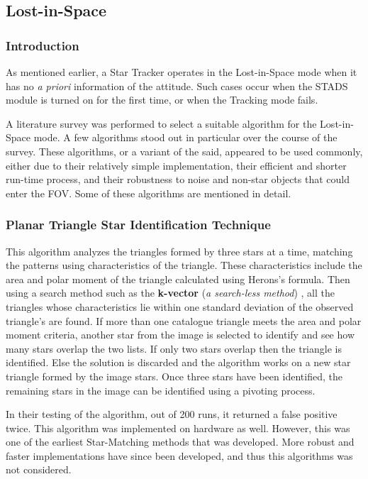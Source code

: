\subsection{Lost-in-Space}
\subsubsection{Introduction}

As mentioned earlier, a Star Tracker operates in the Lost-in-Space mode when it has no \textit{a priori} information of the attitude. Such cases occur when the STADS module is turned on for the first time, or when the Tracking mode fails.

A literature survey was performed to select a suitable algorithm for the Lost-in-Space mode. A few algorithms stood out in particular over the course of the survey. These algorithms, or a variant of the said, appeared to be used commonly, either due to their relatively simple implementation, their efficient and shorter run-time process, and their robustness to noise and non-star objects that could enter the FOV.
Some of these algorithms are mentioned in detail.

\subsubsection{Planar Triangle Star Identification Technique}

This algorithm \cite{mcbryde2012star} analyzes the triangles formed by three stars at a time, matching the patterns using characteristics of the triangle. These characteristics include the area and polar moment of the triangle calculated using Herons’s formula. 
Then using a search method such as the \textbf{k-vector} (\textit{a search-less method}) \cite{mortari2014k}, all the triangles whose characteristics lie within one standard deviation of the observed triangle's are found. 
If more than one catalogue triangle meets the area and polar moment criteria, another star from the image is selected to identify and see how many stars overlap the two lists. If only two stars overlap then the triangle is identified. Else the solution is discarded and the algorithm works on a new star triangle formed by the image stars. 
Once three stars have been identified, the remaining stars in the image can be identified using a pivoting process. 

In their testing of the algorithm, out of 200 runs, it returned a false positive twice. This algorithm was implemented on hardware as well. 
However, this was one of the earliest Star-Matching methods that was developed. More robust and faster implementations have since been developed, and thus this algorithms was not considered.

